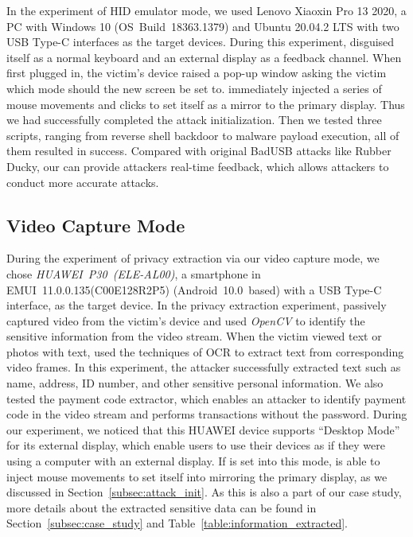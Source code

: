In the experiment of HID emulator mode, we used {Lenovo Xiaoxin Pro 13
2020}, a PC with Windows 10 \mbox{(OS Build 18363.1379)} and Ubuntu 20.04.2 LTS with two \ac{USB} Type-C interfaces as the
target devices. During this experiment, \tool disguised itself as a normal keyboard and an external display as a feedback channel. When first plugged in, the victim's device raised a pop-up window asking the victim which mode should the new screen be set to. \tool immediately injected a series of mouse movements and clicks to set itself as a mirror to the primary display. Thus we had successfully completed the attack initialization. Then we tested three scripts, ranging from reverse shell backdoor to malware payload execution, all of them resulted in success.
Compared with original BadUSB attacks like Rubber Ducky, our \tool can provide attackers real-time feedback, which allows attackers to conduct more accurate attacks.


\subsection{Video Capture Mode}

During the experiment of privacy extraction via our video capture mode, we chose \mbox{\textit{HUAWEI P30 (ELE-AL00)}}, a
smartphone in \mbox{EMUI 11.0.0.135(C00E128R2P5)} \mbox{(Android 10.0 based)} with a \ac{USB} Type-C interface, as the target device.
In the privacy extraction experiment, \tool passively captured video from the victim's device and used \textit{OpenCV} to identify the sensitive information from the video stream.  When the victim viewed text or photos with text, \tool used the techniques of \ac{OCR} to extract text from corresponding video frames.
In this experiment, the attacker successfully extracted text such as name, address, ID number, and other sensitive personal information. We also tested the payment code extractor, which enables an attacker to identify payment code in the video stream and performs transactions
without the password. During our experiment, we noticed that this HUAWEI device supports ``Desktop Mode'' for its external display, which enable users to use their devices as if they were using a computer with an external display.
If \tool is set into this mode, \tool is able to inject mouse movements to set itself into mirroring the primary display, as we discussed in Section~\ref{subsec:attack_init}.
As this is also a part of our case study, more details about
the extracted sensitive data can be found in Section~\ref{subsec:case_study} and
Table~\ref{table:information_extracted}.

